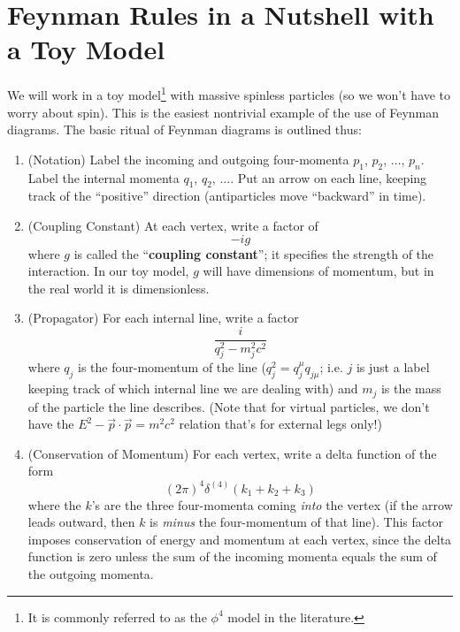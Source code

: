 \section{Feynman Rules in a Nutshell with a Toy Model}


We will work in a toy model\footnote{It is commonly referred to as the $\phi^4$ 
model in the literature.} with massive spinless particles (so we won't have to 
worry about spin). This is the easiest nontrivial example of the use of Feynman 
diagrams. The basic ritual of Feynman diagrams is outlined thus:
\begin{enumerate}
\item{(Notation)} Label the incoming and outgoing four-momenta $p_1$, $p_2$,
$\ldots$, $p_n$. Label the internal momenta $q_1$, $q_2$, $\ldots$. Put an
arrow on each line, keeping track of the ``positive'' direction (antiparticles
move ``backward'' in time).

\item{(Coupling Constant)} At each vertex, write a factor of
\begin{equation*}
-ig
\end{equation*}
where $g$ is called the ``\textbf{coupling constant}''; it specifies the
strength of the interaction. In our toy model, $g$ will have dimensions of
momentum, but in the real world it is dimensionless.

\item{(Propagator)} For each internal line, write a factor
\begin{equation*}
\frac{i}{q_{j}^{2} - m_{j}^2c^2}
\end{equation*}
where $q_j$ is the four-momentum of the line ($q_j^2=q_{j}^{\mu}q_{j\mu}$; i.e.
$j$ is just a label keeping track of which internal line we are dealing with)
and $m_j$ is the mass of the particle the line describes. (Note that for
virtual particles, we don't have the $E^2 - \vec{p}\cdot\vec{p}=m^2c^2$ relation
that's for external legs only!)

\item{(Conservation of Momentum)} For each vertex, write a delta function of
the form
\begin{equation*}
(2\pi)^4\delta^{(4)}(k_1+k_2+k_3)
\end{equation*}
where the $k$'s are the three four-momenta coming \emph{into} the vertex (if
the arrow leads outward, then $k$ is \emph{minus} the four-momentum of that
line). This factor imposes conservation of energy and momentum at each vertex,
since the delta function is zero unless the sum of the incoming momenta equals
the sum of the outgoing momenta.


\end{enumerate}
